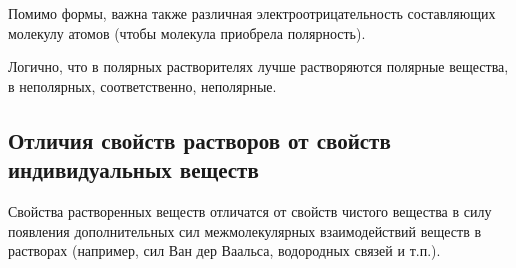 Помимо формы, важна также различная электроотрицательность составляющих молекулу атомов (чтобы молекула приобрела полярность).

Логично, что в полярных растворителях лучше растворяются полярные вещества, в неполярных, соответственно, неполярные.

\subsection{Отличия свойств растворов от свойств индивидуальных веществ}

Свойства растворенных веществ отличатся от свойств чистого вещества в силу появления дополнительных сил межмолекулярных взаимодействий веществ в растворах (например, сил Ван дер Ваальса, водородных связей и т.п.).


